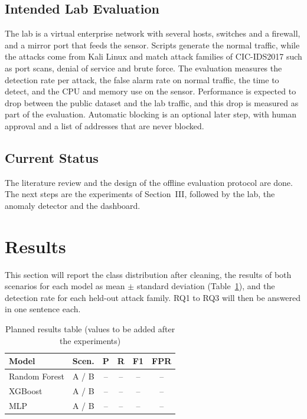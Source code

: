 \documentclass[conference]{IEEEtran}
\newif\ifshowtodo
\newcommand{\todo}[1]{\ifshowtodo{\color{red}\textbf{[TODO: #1]}}\fi}
\begin{document}
\subsection{Intended Lab Evaluation}
The lab is a virtual enterprise network with several hosts, switches and a firewall, and a mirror port that feeds the sensor. \todo{confirm the images and tools available for the lab} Scripts generate the normal traffic, while the attacks come from Kali Linux and match attack families of CIC-IDS2017 such as port scans, denial of service and brute force. The evaluation measures the detection rate per attack, the false alarm rate on normal traffic, the time to detect, and the CPU and memory use on the sensor. Performance is expected to drop between the public dataset and the lab traffic, and this drop is measured as part of the evaluation. Automatic blocking is an optional later step, with human approval and a list of addresses that are never blocked.

\subsection{Current Status}
The literature review and the design of the offline evaluation protocol are done. The next steps are the experiments of Section~III, followed by the lab, the anomaly detector and the dashboard.

\section{Results}
This section will report the class distribution after cleaning, the results of both scenarios for each model as mean $\pm$ standard deviation (Table~\ref{tab:results}), and the detection rate for each held-out attack family. RQ1 to RQ3 will then be answered in one sentence each.

\begin{table}[t]
\caption{Planned results table (values to be added after the experiments)}
\begin{center}
\begin{tabular}{|l|c|c|c|c|c|}
\hline
\textbf{Model} & \textbf{Scen.} & \textbf{P} & \textbf{R} & \textbf{F1} & \textbf{FPR} \\
\hline
Random Forest & A / B & -- & -- & -- & -- \\
\hline
XGBoost & A / B & -- & -- & -- & -- \\
\hline
MLP & A / B & -- & -- & -- & -- \\
\hline
\end{tabular}
\label{tab:results}
\end{center}
\end{table}
\end{document}
